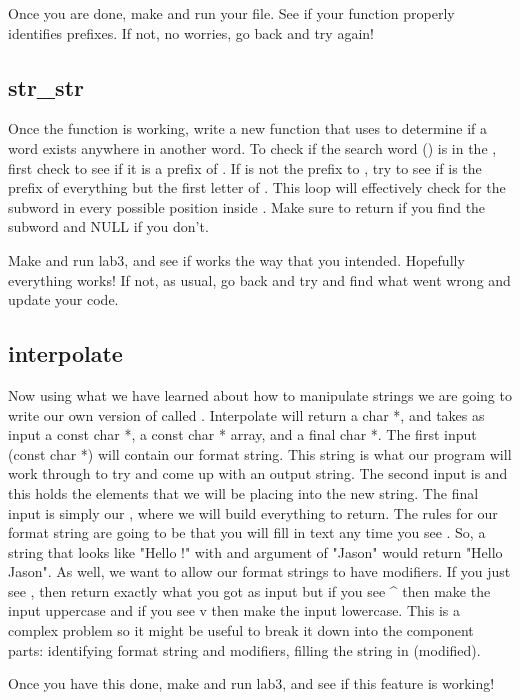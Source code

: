 \documentclass{tufte-handout}
\begin{document}
Once you are done, make and run your file. See if your function properly identifies prefixes. If not, no worries, go back and try again!

\subsection{str_str}

Once the function  is working, write a new function  that uses  to determine if a word exists anywhere in another word. To check if the search word () is in the , first check to see if it is a prefix of . If  is not the prefix to , try to see if  is the prefix of everything but the first letter of . This loop will effectively check for the subword  in every possible position inside . Make sure to return  if you find the subword and NULL if you don't.

Make and run lab3, and see if  works the way that you intended.  Hopefully everything works!  If not, as usual, go back and try and find what went wrong and update your code.

\subsection{interpolate}

Now using what we have learned about how to manipulate strings we are going to write our own version of  called . Interpolate will return a char *, and takes as input a const char *, a const char * array, and a final char *. The first input (const char *)  will contain our format string. This string is what our program will work through to try and come up with an output string. The second input is  and this holds the elements that we will be placing into the new string. The final input is simply our , where we will build everything to return. The rules for our format string are going to be that you will fill in text any time you see {}. So, a string that looks like "Hello {}!" with and argument of "Jason" would return "Hello Jason". As well, we want to allow our format strings to have modifiers. If you just see {}, then return exactly what you got as input but if you see {^} then make the input uppercase and if you see {v} then make the input lowercase. This is a complex problem so it might be useful to break it down into the component parts: identifying format string and modifiers, filling the string in (modified).

Once you have this done, make and run lab3, and see if this feature is working!
\end{document}

